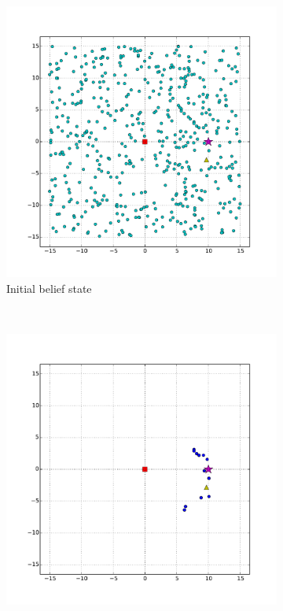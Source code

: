 
\begin{figure}
        \centering
        \begin{subfigure}[b]{0.3\textwidth}
                \includegraphics[width=\textwidth]{bad_heading_initial}
                \caption{Initial belief state}
                \label{fig:bad_heading_init}
        \end{subfigure}%
        ~ %
        \begin{subfigure}[b]{0.3\textwidth}
                \includegraphics[width=\textwidth]{bad_heading_first_obs}

\end{subfigure}
\end{figure}
